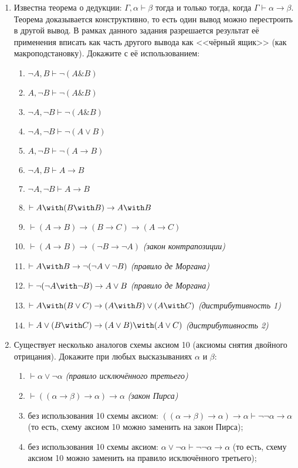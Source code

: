 \documentclass[10pt,a4paper,oneside]{article}
\begin{document}
\begin{enumerate}
\item Известна теорема о дедукции: $\Gamma, \alpha \vdash \beta$ тогда и только тогда, 
когда $\Gamma \vdash \alpha \rightarrow \beta$. Теорема доказывается конструктивно, то есть
один вывод можно перестроить в другой вывод.
В рамках данного задания разрешается результат её применения вписать как часть другого вывода 
как <<чёрный ящик>> (как макроподстановку). Докажите с её использованием:
\begin{enumerate}
\item $\neg A, B \vdash \neg(A\& B)$
\item $A,\neg B \vdash \neg( A\& B)$
\item $\neg A,\neg B \vdash \neg( A\& B)$
\item $\neg A,\neg B \vdash \neg( A\vee B)$
\item $ A,\neg B \vdash \neg( A\rightarrow B)$
\item $\neg A, B \vdash  A\rightarrow B$
\item $\neg A,\neg B \vdash  A\rightarrow B$
\item $\vdash A \with (B \with B) \rightarrow A \with B$
\item $\vdash (A \rightarrow B) \rightarrow (B \rightarrow C) \rightarrow (A \rightarrow C)$
\item $\vdash (A \rightarrow B) \rightarrow (\neg B \rightarrow \neg A)$ \emph{(закон контрапозиции)}
\item $\vdash A \with B \rightarrow \neg (\neg A \vee \neg B)$ \emph{(правило де Моргана)}
\item $\vdash \neg (\neg A \with \neg B) \rightarrow A \vee B$ \emph{(правило де Моргана)}
\item $\vdash A \with (B \vee C) \rightarrow (A \with B) \vee (A \with C)$ \emph{(дистрибутивность 1)}
\item $\vdash A \vee (B \with C) \rightarrow (A \vee B) \with (A \vee C)$ \emph{(дистрибутивность 2)}
\end{enumerate}

\item Существует несколько аналогов схемы аксиом 10 (аксиомы снятия двойного отрицания). Докажите при любых
высказываниях $\alpha$ и $\beta$:
\begin{enumerate}
\item $\vdash \alpha \vee \neg \alpha$ \emph{(правило исключённого третьего)}
\item $\vdash ((\alpha \rightarrow \beta) \rightarrow \alpha)\rightarrow \alpha$ \emph{(закон Пирса)}
\item без использования 10 схемы аксиом: $((\alpha \rightarrow \beta) \rightarrow \alpha)\rightarrow \alpha \vdash \neg\neg \alpha\rightarrow \alpha$
(то есть, схему аксиом 10 можно заменить на закон Пирса);
\item без использования 10 схемы аксиом: $\alpha \vee \neg \alpha \vdash \neg\neg \alpha\rightarrow \alpha$
(то есть, схему аксиом 10 можно заменить на правило исключённого третьего);
\end{enumerate}


\end{enumerate}
\end{document}
